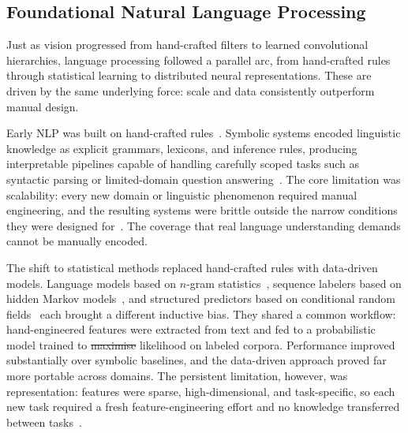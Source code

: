 \documentclass[12pt, a4paper, twoside]{book}
\makeatletter
\numberwithin{equation}{chapter}
\theoremstyle{plain}
\theoremstyle{definition}
\theoremstyle{remark}
\newenvironment{foldable}{}{}
\providecommand{\DIFaddtex}[1]{{\protect\color{blue}\uwave{#1}}} %
\providecommand{\DIFdeltex}[1]{{\protect\color{red}\sout{#1}}} %
\providecommand{\DIFaddbegin}{} %
\providecommand{\DIFaddend}{} %
\providecommand{\DIFdelbegin}{} %
\providecommand{\DIFdelend}{} %
\providecommand{\DIFadd}[1]{\texorpdfstring{\DIFaddtex{#1}}{#1}} %
\providecommand{\DIFdel}[1]{\texorpdfstring{\DIFdeltex{#1}}{}} %
\newcommand{\DIFscaledelfig}{0.5}
\newlength{\DIFdelgraphicswidth} %
\newlength{\DIFdelgraphicsheight} %
\newcommand{\DIFaddincludegraphics}[2][]{{\color{blue}\fbox{\DIFOincludegraphics[#1]{#2}}}} %
\newcommand{\DIFdelincludegraphics}[2][]{%
\sbox{\DIFdelgraphicsbox}{\DIFOincludegraphics[#1]{#2}}%
\settoboxwidth{\DIFdelgraphicswidth}{\DIFdelgraphicsbox} %
\settoboxtotalheight{\DIFdelgraphicsheight}{\DIFdelgraphicsbox} %
\scalebox{\DIFscaledelfig}{%
\parbox[b]{\DIFdelgraphicswidth}{\usebox{\DIFdelgraphicsbox}\\[-\baselineskip] \rule{\DIFdelgraphicswidth}{0em}}\llap{\resizebox{\DIFdelgraphicswidth}{\DIFdelgraphicsheight}{%
\setlength{\unitlength}{\DIFdelgraphicswidth}%
\begin{picture}(1,1)%
\thicklines\linethickness{2pt} %
{\color[rgb]{1,0,0}\put(0,0){\framebox(1,1){}}}%
{\color[rgb]{1,0,0}\put(0,0){\line( 1,1){1}}}%
{\color[rgb]{1,0,0}\put(0,1){\line(1,-1){1}}}%
\end{picture}%
}\hspace*{3pt}}} %
} %
\DeclareRobustCommand{\DIFaddbegin}{\DIFOaddbegin \let\includegraphics\DIFaddincludegraphics} %
\DeclareRobustCommand{\DIFaddend}{\DIFOaddend \let\includegraphics\DIFOincludegraphics} %
\DeclareRobustCommand{\DIFdelbegin}{\DIFOdelbegin \let\includegraphics\DIFdelincludegraphics} %
\DeclareRobustCommand{\DIFdelend}{\DIFOaddend \let\includegraphics\DIFOincludegraphics} %
\let\sout@orig\sout %
\renewcommand{\sout}[1]{\ifmmode\text{\sout@orig{\ensuremath{#1}}}\else\sout@orig{#1}\fi} %
\makeatother
\begin{document}
\subsection{Foundational Natural Language Processing} \label{sec:21-background-deeplearning-foundationalnlp}
\begin{foldable}
  Just as vision progressed from hand-crafted filters to learned convolutional hierarchies, language processing followed a parallel arc, from hand-crafted rules through statistical learning to distributed neural representations.
  These are driven by the same underlying force: scale and data consistently outperform manual design.
\end{foldable}

\begin{foldable}
  Early \ac{NLP} was built on hand-crafted rules~\cite{chomsky1956three}.
  Symbolic systems encoded linguistic knowledge as explicit grammars, lexicons, and inference rules, producing interpretable pipelines capable of handling carefully scoped tasks such as syntactic parsing or limited-domain question answering~\cite{winograd1971procedures}.
  The core limitation was scalability: every new domain or linguistic phenomenon required manual engineering, and the resulting systems were brittle outside the narrow conditions they were designed for~\cite{manning1999foundations}.
  The coverage that real language understanding demands cannot be manually encoded.
\end{foldable}

\begin{foldable}
  The shift to statistical methods replaced hand-crafted rules with data-driven models.
  Language models based on $n$-gram statistics~\cite{shannon1948mathematical}, sequence labelers based on hidden Markov models~\cite{rabiner2002tutorial}, and structured predictors based on conditional random fields~\cite{lafferty2001conditional} each brought a different inductive bias.
  They shared a common workflow: hand-engineered features were extracted from text and fed to a probabilistic model trained to \DIFdelbegin \DIFdel{maximise }\DIFdelend \DIFaddbegin \DIFadd{maximize }\DIFaddend likelihood on labeled corpora.
  Performance improved substantially over symbolic baselines, and the data-driven approach proved far more portable across domains.
  The persistent limitation, however, was representation: features were sparse, high-dimensional, and task-specific, so each new task required a fresh feature-engineering effort and no knowledge transferred between tasks~\cite{bengio2003neural}.
\end{foldable}
\end{document}
